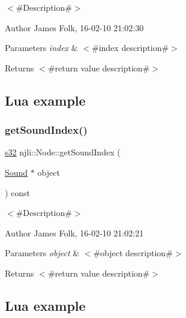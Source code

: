 $<$\#\+Description\#$>$ 

\begin{DoxyAuthor}{Author}
James Folk, 16-\/02-\/10 21\+:02\+:30
\end{DoxyAuthor}

\begin{DoxyParams}{Parameters}
{\em index} & $<$\#index description\#$>$\\
\hline
\end{DoxyParams}
\begin{DoxyReturn}{Returns}
$<$\#return value description\#$>$
\end{DoxyReturn}
\hypertarget{classnjli_1_1_steering_behavior_wander_ex1}{}\subsection{Lua example}\label{classnjli_1_1_steering_behavior_wander_ex1}

\begin{DoxyCodeInclude}
\end{DoxyCodeInclude}
\mbox{\label{classnjli_1_1_node_ab59f6b844d0ee80eb65e3ea6a9b0ceee}} 
\subsubsection{\texorpdfstring{get\+Sound\+Index()}{getSoundIndex()}}
{\footnotesize\ttfamily \mbox{\hyperlink{_util_8h_aa62c75d314a0d1f37f79c4b73b2292e2}{s32}} njli\+::\+Node\+::get\+Sound\+Index (\begin{DoxyParamCaption}\item[{\mbox{\hyperlink{classnjli_1_1_sound}{Sound}} $\ast$}]{object }\end{DoxyParamCaption}) const}



$<$\#\+Description\#$>$ 

\begin{DoxyAuthor}{Author}
James Folk, 16-\/02-\/10 21\+:02\+:21
\end{DoxyAuthor}

\begin{DoxyParams}{Parameters}
{\em object} & $<$\#object description\#$>$\\
\hline
\end{DoxyParams}
\begin{DoxyReturn}{Returns}
$<$\#return value description\#$>$
\end{DoxyReturn}
\hypertarget{classnjli_1_1_steering_behavior_wander_ex1}{}\subsection{Lua example}\label{classnjli_1_1_steering_behavior_wander_ex1}

